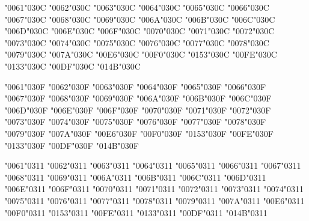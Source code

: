 {\textsc{\char"0061\char"030C} \textsc{\char"0062\char"030C} \textsc{\char"0063\char"030C} \textsc{\char"0064\char"030C} \textsc{\char"0065\char"030C} \textsc{\char"0066\char"030C} \textsc{\char"0067\char"030C} \textsc{\char"0068\char"030C} \textsc{\char"0069\char"030C} \textsc{\char"006A\char"030C} \textsc{\char"006B\char"030C} \textsc{\char"006C\char"030C} \textsc{\char"006D\char"030C} \textsc{\char"006E\char"030C} \textsc{\char"006F\char"030C} \textsc{\char"0070\char"030C} \textsc{\char"0071\char"030C} \textsc{\char"0072\char"030C} \textsc{\char"0073\char"030C} \textsc{\char"0074\char"030C} \textsc{\char"0075\char"030C} \textsc{\char"0076\char"030C} \textsc{\char"0077\char"030C} \textsc{\char"0078\char"030C} \textsc{\char"0079\char"030C} \textsc{\char"007A\char"030C} \textsc{\char"00E6\char"030C} \textsc{\char"00F0\char"030C} \textsc{\char"0153\char"030C} \textsc{\char"00FE\char"030C} \textsc{\char"0133\char"030C} \textsc{\char"00DF\char"030C} \textsc{\char"014B\char"030C}

\textsc{\char"0061\char"030F} \textsc{\char"0062\char"030F} \textsc{\char"0063\char"030F} \textsc{\char"0064\char"030F} \textsc{\char"0065\char"030F} \textsc{\char"0066\char"030F} \textsc{\char"0067\char"030F} \textsc{\char"0068\char"030F} \textsc{\char"0069\char"030F} \textsc{\char"006A\char"030F} \textsc{\char"006B\char"030F} \textsc{\char"006C\char"030F} \textsc{\char"006D\char"030F} \textsc{\char"006E\char"030F} \textsc{\char"006F\char"030F} \textsc{\char"0070\char"030F} \textsc{\char"0071\char"030F} \textsc{\char"0072\char"030F} \textsc{\char"0073\char"030F} \textsc{\char"0074\char"030F} \textsc{\char"0075\char"030F} \textsc{\char"0076\char"030F} \textsc{\char"0077\char"030F} \textsc{\char"0078\char"030F} \textsc{\char"0079\char"030F} \textsc{\char"007A\char"030F} \textsc{\char"00E6\char"030F} \textsc{\char"00F0\char"030F} \textsc{\char"0153\char"030F} \textsc{\char"00FE\char"030F} \textsc{\char"0133\char"030F} \textsc{\char"00DF\char"030F} \textsc{\char"014B\char"030F}

\textsc{\char"0061\char"0311} \textsc{\char"0062\char"0311} \textsc{\char"0063\char"0311} \textsc{\char"0064\char"0311} \textsc{\char"0065\char"0311} \textsc{\char"0066\char"0311} \textsc{\char"0067\char"0311} \textsc{\char"0068\char"0311} \textsc{\char"0069\char"0311} \textsc{\char"006A\char"0311} \textsc{\char"006B\char"0311} \textsc{\char"006C\char"0311} \textsc{\char"006D\char"0311} \textsc{\char"006E\char"0311} \textsc{\char"006F\char"0311} \textsc{\char"0070\char"0311} \textsc{\char"0071\char"0311} \textsc{\char"0072\char"0311} \textsc{\char"0073\char"0311} \textsc{\char"0074\char"0311} \textsc{\char"0075\char"0311} \textsc{\char"0076\char"0311} \textsc{\char"0077\char"0311} \textsc{\char"0078\char"0311} \textsc{\char"0079\char"0311} \textsc{\char"007A\char"0311} \textsc{\char"00E6\char"0311} \textsc{\char"00F0\char"0311} \textsc{\char"0153\char"0311} \textsc{\char"00FE\char"0311} \textsc{\char"0133\char"0311} \textsc{\char"00DF\char"0311} \textsc{\char"014B\char"0311}

}


